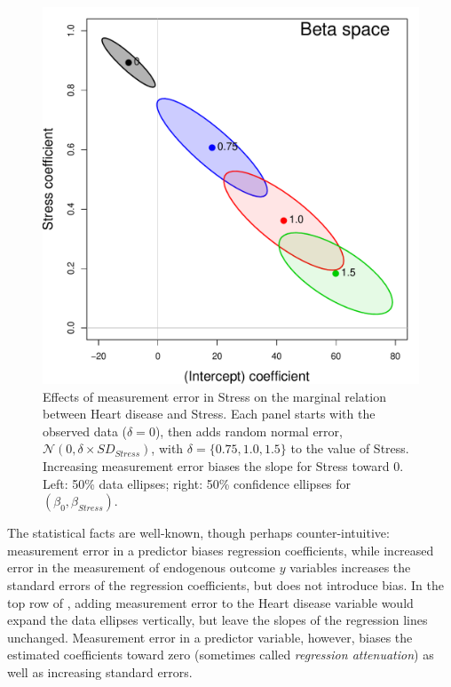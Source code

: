 \begin{figure}[htb]
\begin{minipage}[b]{.49\linewidth}
  \includegraphics[width=1\linewidth]{fig/coffee-stress2}
 \end{minipage}
  \caption{Effects of measurement error in Stress on the marginal relation between Heart disease and Stress.
  Each panel starts with the observed data ($\delta=0$), then adds random normal error, 
  $\mathcal{N}(0, \delta \times SD_{Stress})$, with $\delta = \{0.75, 1.0, 1.5\}$ to the value of Stress.
  Increasing measurement error biases the slope for Stress toward 0.
  Left: 50\% data ellipses; right: 50\% confidence ellipses for $(\beta_0, \beta_{Stress})$. }
  \label{fig:coffee-stress}
\end{figure}

The statistical facts are well-known, though perhaps counter-intuitive:
measurement error in a predictor biases regression coefficients, while
increased error in the measurement of endogenous outcome $y$
variables increases the standard errors of the regression coefficients, but does not introduce
bias. 
In the top row of
, adding measurement error to the Heart disease variable
would expand the data ellipses vertically, but leave the slopes of the regression lines unchanged.
Measurement error in a predictor variable, however, biases the estimated coefficients toward
zero (sometimes called \emph{regression attenuation}) as well as increasing standard errors.

